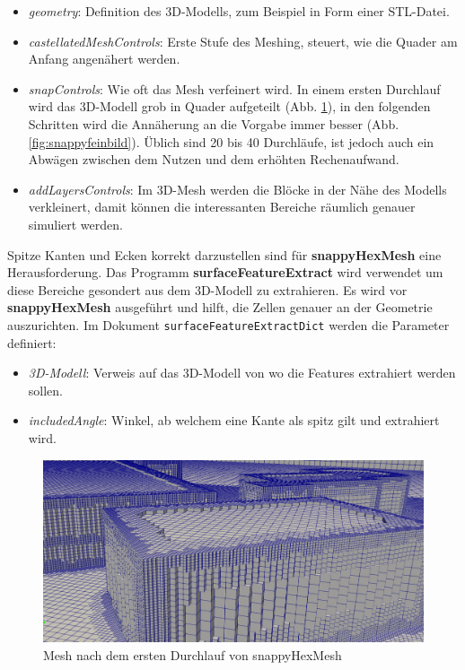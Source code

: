 \begin{itemize}
    \item \textit{geometry}: Definition des 3D-Modells, zum Beispiel in Form einer STL-Datei.
%
    \item \textit{castellatedMeshControls}: Erste Stufe des Meshing, steuert, wie die Quader am Anfang angenähert werden.
%
    \item \textit{snapControls}: Wie oft das Mesh verfeinert wird. 
%
    In einem ersten Durchlauf wird das 3D-Modell grob in Quader aufgeteilt (Abb. \ref{fig:snappygrobbild}),
    in den folgenden Schritten wird die Annäherung an die Vorgabe immer besser (Abb. \ref{fig:snappyfeinbild}).
    Üblich sind 20 bis 40 Durchläufe, ist jedoch auch ein Abwägen zwischen dem Nutzen und dem erhöhten Rechenaufwand.
    \item \textit{addLayersControls}: Im 3D-Mesh werden die Blöcke in der Nähe des Modells verkleinert, 
%
    damit können die interessanten Bereiche räumlich genauer simuliert werden.
\end{itemize}
Spitze Kanten und Ecken korrekt darzustellen sind für \textbf{snappyHexMesh} eine Herausforderung.
Das Programm \textbf{surfaceFeatureExtract} wird verwendet um diese Bereiche gesondert aus dem 3D-Modell zu extrahieren.
%
Es wird vor \textbf{snappyHexMesh} ausgeführt und hilft, die Zellen genauer an der Geometrie auszurichten.
Im Dokument \texttt{surfaceFeature}\-\texttt{ExtractDict} werden die Parameter definiert:

\begin{itemize}
    \item \textit{3D-Modell}: Verweis auf das 3D-Modell von wo die Features extrahiert werden sollen.
%
    \item \textit{includedAngle}: Winkel, ab welchem eine Kante als spitz gilt und extrahiert wird.
%
\end{itemize}

\begin{figure}
    \centering
    \includegraphics[width=\textwidth]{papers/openfoam/Bilder/Snappy_grob.png}
    \caption{Mesh nach dem ersten Durchlauf von snappyHexMesh}
    \label{fig:snappygrobbild}
\end{figure}

